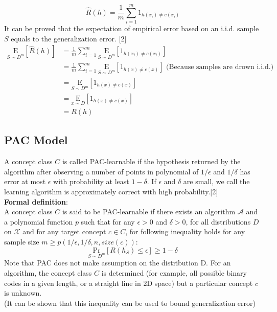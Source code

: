 \documentclass[12pt]{article}
\theoremstyle{definition}
\theoremstyle{remark}
\numberwithin{equation}{section}
\begin{document}
\[\widehat{R}(h)= \frac{1}{m}\sum_{i=1}^{m}1_{h(x_i) \neq c(x_i)}\]
It can be proved that the expectation of empirical error based on an i.i.d. sample $S$ equals to the generalization error. [2]
\begin{align*}
 \underset{S \sim D^m}{\text{E}}[\widehat{R}(h)] &= \frac{1}{m}\sum_{i=1}^{m}\underset{S \sim D^m}{\text{E}}[1_{h(x_i) \neq c(x_i)}] \\
 &= \frac{1}{m}\sum_{i=1}^{m}\underset{S \sim D^m}{\text{E}}[1_{h(x) \neq c(x)}] \text{  (Because samples are drown i.i.d.)} \\
 &= \underset{S \sim D^m}{\text{E}}[1_{h(x) \neq c(x)}] \\
 &= \underset{x \sim D}{\text{E}}[1_{h(x) \neq c(x)}] \\
 &= R(h)
\end{align*}
\subsection{PAC Model}
A concept class $C$ is called PAC-learnable if the hypothesis returned by the algorithm after observing a number of points in polynomial of $1/\epsilon$ and $1/\delta$ has error at most $\epsilon$ with probability at least $1-\delta$. If $\epsilon$ and $\delta$ are small, we call the learning algorithm is approximately correct with high probability.[2] \\[0.2cm]
\textbf{Formal definition}:\\[0.2cm]
A concept class $C$ is said to be PAC-learnable if there exists an algorithm $\mathcal{A}$ and a polynomial function $p$ such that for any $\epsilon > 0$ and $\delta > 0$, for all distributions $D$ on $\mathcal{X}$ and for any target concept $c \in C$, for following inequality holds for any sample size $ m \geq p(1/\epsilon,1/\delta,n,size(c) )$:
\[\underset{S \sim D^m}{\text{Pr}}[R(h_S) \leq \epsilon ] \geq 1 - \delta \]
Note that PAC does not make assumption on the distribution D. For an algorithm, the concept class $C$ is determined (for example, all possible binary codes in a given length, or a straight line in 2D space) but a particular concept $c$ is unknown. \\[0.2cm]
(It can be shown that this inequality can be used to bound generalization error)
\end{document}
